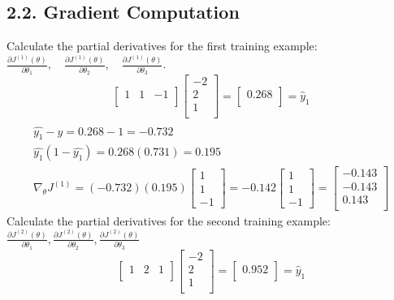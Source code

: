 \documentclass[11pt]{article}
\theoremstyle{plain}
\begin{document}
\subsection*{2.2. Gradient Computation }
Calculate the partial derivatives for the first training example:
$\frac{\partial J^{(1)}(\theta)}{\partial \theta_1}, \quad \frac{\partial J^{(1)}(\theta)}{\partial \theta_2}, \quad \frac{\partial J^{(1)}(\theta)}{\partial \theta_3}.$
\[
	\begin{bmatrix}
		1 & 1 & -1 \\
	\end{bmatrix}
	\begin{bmatrix}
		-2 \\
		2  \\
		1  \\
	\end{bmatrix} =
	\begin{bmatrix}
		0.268 \\
	\end{bmatrix} = \hat{y}_1
\]
\[
	\begin{gathered}
		\\ \hat{y_1} - y = 0.268-1 = -0.732
		\\ \hat{y_1} (1-\hat{y_1}) = 0.268(0.731) = 0.195
		\\ \nabla_{\theta}J^{(1)} = (-0.732)(0.195) \begin{bmatrix} 1 \\ 1 \\ -1\end{bmatrix}
		= -0.142
		\begin{bmatrix}
			1 \\
			1 \\
			-1
		\end{bmatrix}
		=
		\begin{bmatrix}
			-0.143 \\
			-0.143 \\
			0.143  \\
		\end{bmatrix}
	\end{gathered}
\]
Calculate the partial derivatives for the second training example: $\frac{\partial J^{(2)}(\theta)}{\partial\theta_{1}},\frac{\partial J^{(2)}(\theta)}{\partial\theta_{2}},\frac{\partial J^{(2)}(\theta)}{\partial\theta_{3}}$
\[
	\begin{bmatrix}
		1 & 2 & 1 \\
	\end{bmatrix}
	\begin{bmatrix}
		-2 \\
		2  \\
		1  \\
	\end{bmatrix} =
	\begin{bmatrix}
		0.952 \\
	\end{bmatrix} = \hat{y}_1
\]
\end{document}
